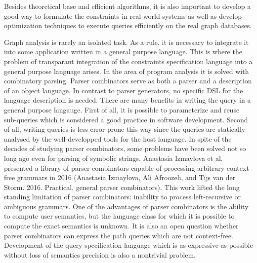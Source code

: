 \documentclass[12pt]{article}  %
\theoremstyle{remark}
\begin{document}
Besides theoretical base and efficient algorithms, it is also important to develop a good way to formulate the constraints in real-world systems as well as develop optimization techniques to execute queries efficiently on the real graph databases.

Graph analysis is rarely an isolated task. As a rule, it is necessary to integrate it into some application written in a general purpose language. This is where the problem of transparant integration of the constraints specification language into a general purpose language arises. In the area of program analysis it is solved with combinatory parsing. Parser combinators serve as both a parser and a description of an object language. In contrast to parser generators, no specific DSL for the language description is needed. There are many benefits in writing the query in a general purpose langauge. First of all, it is possible to parameterize and reuse sub-queries which is considered a good practice in software development. Second of all, writing queries is less error-prone this way since the queries are statically analysed by the well-developped tools for the host language. In spite of the decades of studying parser combinators, some problems have been solved not so long ago even for parsing of symbolic strings. Anastasia Izmaylova et al. presented a library of parser combinators capable of processing arbitrary context-free grammars in 2016 (Anastasia Izmaylova, Ali Afroozeh, and Tijs van der Storm. 2016. Practical, general parser combinators). This work lifted the long standing limitation of parser combinators: inability to process left-recursive or ambiguous grammars. One of the advantages of parser combinators is the ability to compute user semantics, but the language class for which it is possible to compute the exact semantics is unknown. It is also an open question whether parser combinators can express the path queries which are not context-free. Development of the query specification language which is as expressive as possible without loss of semantics precision is also a nontrivial problem.
\end{document}
